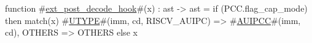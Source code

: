 function #\hyperref[sailRISCVzextzypostzydecodezyhook]{ext\_post\_decode\_hook}#(x) : ast -> ast = {
  if (PCC.flag_cap_mode) then match(x) {
    #\hyperref[sailRISCVzUTYPE]{UTYPE}#(imm, cd, RISCV_AUIPC) => #\hyperref[sailRISCVzAUIPCC]{AUIPCC}#(imm, cd),
    OTHERS => OTHERS
  } else
    x
}
